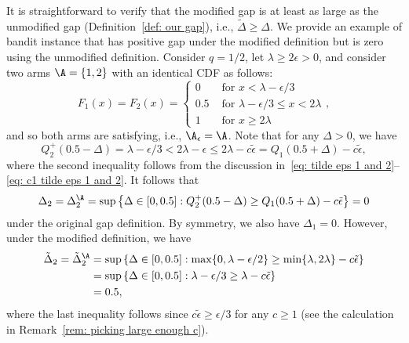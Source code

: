It is straightforward to verify that the modified gap is at least as large as the unmodified gap (Definition~\ref{def: our gap}), i.e., $\tilde{\Delta} \ge \Delta$. We provide an example of bandit instance that has positive gap under the modified definition but is zero using the unmodified definition. Consider $q = 1/2$, let $\lambda \ge 2 \epsilon > 0$, and consider two arms $\A = \{1, 2\}$ with an identical CDF as follows:
\begin{equation}
    F_1(x) = 
    F_2(x) =
    \begin{cases}
        0 & \text{ for } x < \lambda - \epsilon/3 \\
        0.5 & \text{ for } \lambda - \epsilon/3 \le x < 2 \lambda \\
        1 & \text{ for } x \ge 2 \lambda 
    \end{cases},
\end{equation}
and so both arms are satisfying, i.e., $\A_{\epsilon} = \A$.
Note that for any $\Delta > 0$, we have
\begin{equation}
    Q^+_2(0.5 - \Delta)  =
    \lambda - \epsilon/3 <
    2\lambda - \epsilon \le
     2\lambda - c\tilde{\epsilon} =
    Q_1(0.5 + \Delta) - c\tilde{\epsilon},
\end{equation}
where the second inequality follows from the discussion in~\eqref{eq: tilde eps 1 and 2}--\eqref{eq: c1 tilde eps 1 and 2}. It follows that
\begin{equation}
    \Delta_2 
    = \Delta_{2}^{\A}
    =
    \sup
    \left\{
        \Delta \in [0,0.5]
        :
        Q^+_2(0.5 - \Delta) 
        \ge
        Q_{1}(0.5 + \Delta) - c\tilde{\epsilon}
        \right\} 
    = 0
\end{equation}
under the original gap definition. By symmetry, we also have $\Delta_1 = 0$.
However, under the modified definition, we have
\begin{align}
     \tilde{\Delta}_2 
    = \tilde{\Delta}_{2}^{\A}
    &= \sup
    \left\{
        \Delta \in [0, 0.5]
        :
        \max\{0,  \lambda - \epsilon/2 \}
        \ge
        \min\{\lambda, 2 \lambda\} - c\tilde{\epsilon}
        \right\} \\
    &= \sup
    \left\{
        \Delta \in [0, 0.5]
        :
          \lambda - \epsilon/3 
        \ge
        \lambda  - c\tilde{\epsilon}
        \right\} \\
        &= 0.5,
\end{align}
    where the last inequality follows since 
    $c\tilde{\epsilon} \ge \epsilon/3 $ for any $c \ge 1$ 
    (see the calculation in Remark~\ref{rem: picking large enough c}).

